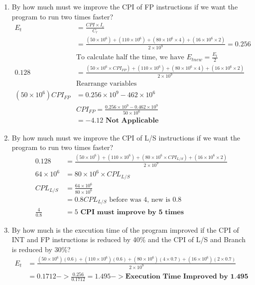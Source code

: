 \documentclass[10pt]{article}
\begin{document}
\begin{enumerate}
    \begin{enumerate}
        \item 
        By how much must we improve the CPI of FP instructions if we want the program to run two times faster?
        \begin{align*}
            E_t &= \frac{CPI \times I_c}{C_r}\\
            &= \frac{(50 \times 10^6) + (110 \times 10^6) + (80 \times 10^6 \times 4) + (16 \times 10^6 \times 2)}{2 \times 10^9} = 0.256\\
            &\text{To calculate half the time, we have $E_{tnew} = \frac{E_t}{2}$}\\
            0.128 &= \frac{(50 \times 10^6 \times CPI_{FP}) + (110 \times 10^6) + (80 \times 10^6 \times 4) + (16 \times 10^6 \times 2)}{2 \times 10^9}\\
            &\text{Rearrange variables}\\
            (50 \times 10^6) CPI_{FP} &= 0.256 \times 10^9 - 462 \times 10^6\\
            &CPI_{FP}= \frac{0.256 \times 10^9 - 0.462 \times 10^9}{50 \times 10^6}\\
            &= -4.12 \textbf{ Not Applicable}
        \end{align*}
        \item
        By how much must we improve the CPI of L/S instructions if we want the program to run two times faster?
        \begin{align*}
            0.128 &= \frac{(50 \times 10^6) + (110 \times 10^6) + (80 \times 10^6 \times CPI_{L/S}) + (16 \times 10^6 \times 2)}{2 \times 10^9}\\
            64 \times 10^6 &= 80 \times 10^6 \times CPL_{L/S}\\
            CPL_{L/S} &= \frac{64 \times 10^6}{80 \times 10^6}\\
            &= 0.8
            \text{$CPL_{L/S}$ before was 4, new is 0.8}\\
            \frac{4}{0.8} &= 5 \textbf{ CPI must improve by 5 times}
        \end{align*}
        \item
        By how much is the execution time of the program improved if the CPI of INT and FP instructions is reduced by 40\% and the CPI of L/S and Branch is reduced by 30\%?
        \begin{align*}
            E_t &= \frac{(50 \times 10^6)(0.6) + (110 \times 10^6)(0.6) + (80 \times 10^6)(4 \times 0.7) + (16 \times 10^6)(2 \times 0.7)}{2 \times 10^9}\\
            &= 0.1712 -> \frac{0.256}{0.1712} = 1.495 -> \textbf{Execution Time Improved by 1.495}\\
        \end{align*}
    \end{enumerate}
\end{enumerate}
\end{document}
